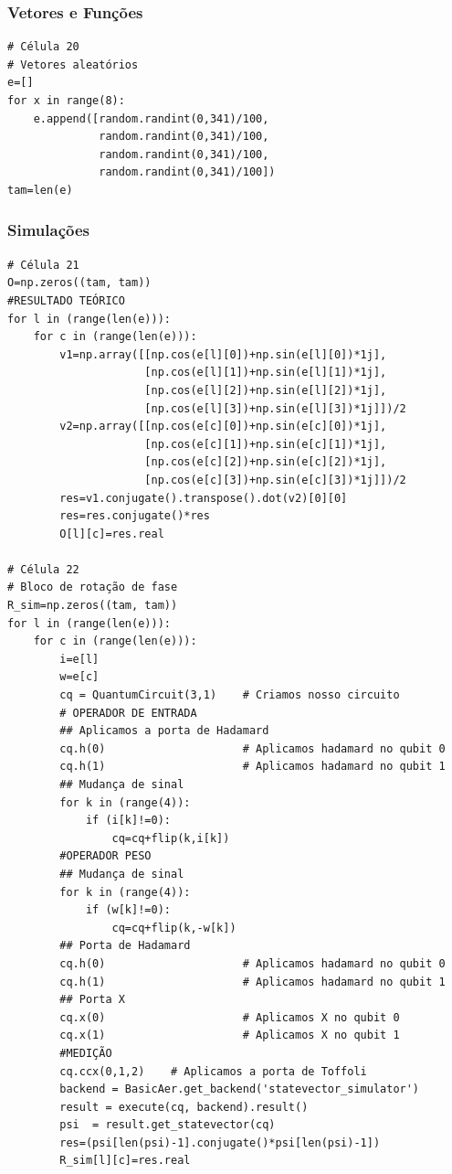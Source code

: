 \subsubsection{Vetores e Funções}
\begin{verbatim}
# Célula 20
# Vetores aleatórios
e=[]
for x in range(8):
    e.append([random.randint(0,341)/100,
              random.randint(0,341)/100,
              random.randint(0,341)/100,
              random.randint(0,341)/100])
tam=len(e)
\end{verbatim}
\subsubsection{Simulações}
\begin{verbatim}
# Célula 21
O=np.zeros((tam, tam))
#RESULTADO TEÓRICO
for l in (range(len(e))):
    for c in (range(len(e))):
        v1=np.array([[np.cos(e[l][0])+np.sin(e[l][0])*1j],
                     [np.cos(e[l][1])+np.sin(e[l][1])*1j],
                     [np.cos(e[l][2])+np.sin(e[l][2])*1j],
                     [np.cos(e[l][3])+np.sin(e[l][3])*1j]])/2
        v2=np.array([[np.cos(e[c][0])+np.sin(e[c][0])*1j],
                     [np.cos(e[c][1])+np.sin(e[c][1])*1j],
                     [np.cos(e[c][2])+np.sin(e[c][2])*1j],
                     [np.cos(e[c][3])+np.sin(e[c][3])*1j]])/2
        res=v1.conjugate().transpose().dot(v2)[0][0]
        res=res.conjugate()*res
        O[l][c]=res.real

# Célula 22
# Bloco de rotação de fase
R_sim=np.zeros((tam, tam))
for l in (range(len(e))):
    for c in (range(len(e))):
        i=e[l]
        w=e[c]
        cq = QuantumCircuit(3,1)    # Criamos nosso circuito        
        # OPERADOR DE ENTRADA
        ## Aplicamos a porta de Hadamard
        cq.h(0)                     # Aplicamos hadamard no qubit 0
        cq.h(1)                     # Aplicamos hadamard no qubit 1        
        ## Mudança de sinal
        for k in (range(4)):
            if (i[k]!=0):               
                cq=cq+flip(k,i[k])
        #OPERADOR PESO
        ## Mudança de sinal
        for k in (range(4)):
            if (w[k]!=0):
                cq=cq+flip(k,-w[k])
        ## Porta de Hadamard
        cq.h(0)                     # Aplicamos hadamard no qubit 0
        cq.h(1)                     # Aplicamos hadamard no qubit 1
        ## Porta X
        cq.x(0)                     # Aplicamos X no qubit 0
        cq.x(1)                     # Aplicamos X no qubit 1
        #MEDIÇÃO
        cq.ccx(0,1,2)    # Aplicamos a porta de Toffoli
        backend = BasicAer.get_backend('statevector_simulator')
        result = execute(cq, backend).result()                   
        psi  = result.get_statevector(cq)                        
        res=(psi[len(psi)-1].conjugate()*psi[len(psi)-1])
        R_sim[l][c]=res.real


\end{verbatim}
